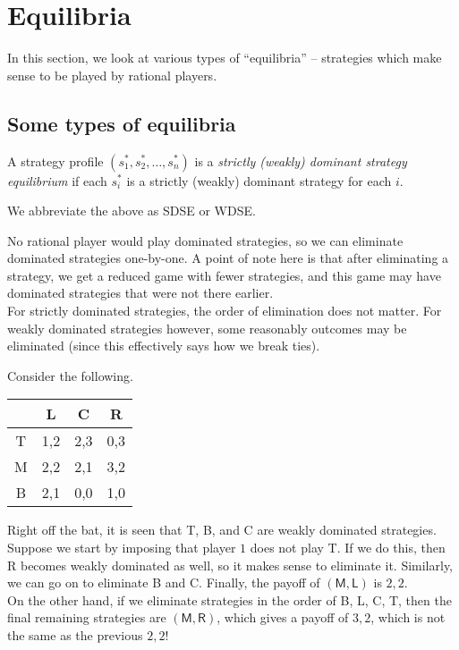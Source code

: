 \section{Equilibria}

	In this section, we look at various types of ``equilibria'' -- strategies which make sense to be played by rational players.

\subsection{Some types of equilibria}

	\begin{fdef}
		A strategy profile $(s_1^*,s_2^*,\ldots,s_n^*)$ is a \emph{strictly (weakly) dominant strategy equilibrium} if each $s_i^*$ is a strictly (weakly) dominant strategy for each $i$.
	\end{fdef}
	We abbreviate the above as SDSE or WDSE.

	No rational player would play dominated strategies, so we can eliminate dominated strategies one-by-one. A point of note here is that after eliminating a strategy, we get a reduced game with fewer strategies, and this game may have dominated strategies that were not there earlier.\\
	For strictly dominated strategies, the order of elimination does not matter. For weakly dominated strategies however, some reasonably outcomes may be eliminated (since this effectively says how we break ties).

	\begin{fex}
		\label{example: order of eliminating dominated strategies}
		Consider the following.
		\begin{center}
		\begin{tabular}{|c||c|c|c|}
			\hline
			& \textsf{L} & \textsf{C} & \textsf{R} \\
			\hline\hline
			\textsf{T} & 1,2 & 2,3 & 0,3 \\
			\hline
			\textsf{M} & 2,2 & 2,1 & 3,2 \\
			\hline
			\textsf{B} & 2,1 & 0,0 & 1,0 \\ \hline
		\end{tabular}
		\end{center}


		Right off the bat, it is seen that \textsf{T}, \textsf{B}, and \textsf{C} are weakly dominated strategies. Suppose we start by imposing that player $1$ does not play \textsf{T}. If we do this, then \textsf{R} becomes weakly dominated as well, so it makes sense to eliminate it. Similarly, we can go on to eliminate \textsf{B} and \textsf{C}. Finally, the payoff of $(\mathsf{M},\mathsf{L})$ is $2,2$.\\
		On the other hand, if we eliminate strategies in the order of \textsf{B}, \textsf{L}, \textsf{C}, \textsf{T}, then the final remaining strategies are $(\mathsf{M},\mathsf{R})$, which gives a payoff of $3,2$, which is not the same as the previous $2,2$!
	\end{fex}


